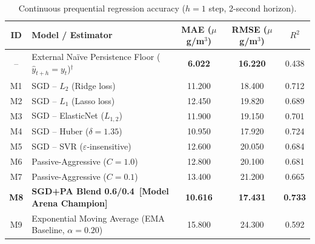 \documentclass[12pt,a4paper]{article}
\newcommand{\ugsm}{$\mu$g/m$^3$}
\begin{document}
\begin{table}[htbp]
\centering
\caption{Comparative prequential performance on the bench-scale real PM$_{2.5}$ stream ($N=499$ scored samples). Disaggregating continuous regression error (Table~\ref{tab:modelarena}a) from discrete hazard-actuation control utility (Table~\ref{tab:modelarena}b) demonstrates that Euclidean error and control utility represent distinct operational objectives.}
\label{tab:modelarena}
\begin{subtable}{\linewidth}
\centering
\caption{Continuous prequential regression accuracy ($h=1$ step, 2-second horizon).}
\label{tab:modelarena-a}
\footnotesize
\setlength{\tabcolsep}{6pt}
\begin{tabular}{@{}clccc@{}}
\toprule
\textbf{ID} & \textbf{Model / Estimator} & \textbf{MAE (\ugsm)} & \textbf{RMSE (\ugsm)} & \textbf{$R^2$} \\
\midrule
-- & External Na\"ive Persistence Floor ($\hat{y}_{t+h}=y_t$)$^\dagger$ & \textbf{6.022} & \textbf{16.220} & 0.438 \\
\midrule
M1 & SGD -- $L_2$ (Ridge loss)            & 11.200 & 18.400 & 0.712 \\
M2 & SGD -- $L_1$ (Lasso loss)            & 12.450 & 19.820 & 0.689 \\
M3 & SGD -- ElasticNet ($L_{1,2}$)        & 11.900 & 19.150 & 0.701 \\
M4 & SGD -- Huber ($\delta=1.35$)         & 10.950 & 17.920 & 0.724 \\
M5 & SGD -- SVR ($\varepsilon$-insensitive) & 12.600 & 20.050 & 0.684 \\
M6 & Passive-Aggressive ($C=1.0$)         & 12.800 & 20.100 & 0.681 \\
M7 & Passive-Aggressive ($C=0.1$)         & 13.400 & 21.200 & 0.665 \\
\textbf{M8} & \textbf{SGD+PA Blend 0.6/0.4~[Model Arena Champion]} & \textbf{10.616} & \textbf{17.431} & \textbf{0.733} \\
M9 & Exponential Moving Average (EMA Baseline, $\alpha=0.20$) & 15.800 & 24.300 & 0.592 \\
\bottomrule
\end{tabular}
\end{subtable}

\vspace{6pt}


\end{table}
\end{document}
